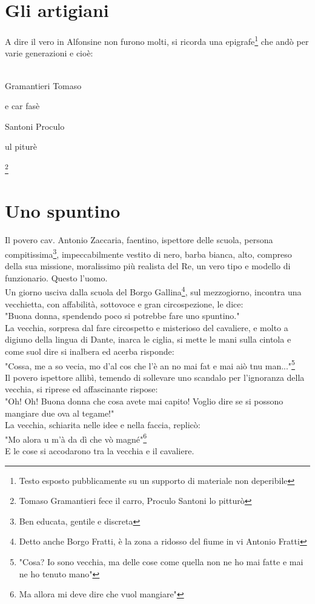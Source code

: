 \documentclass[10pt]{memoir} %
\begin{document}

\chapter{Gli artigiani}

A dire il vero in Alfonsine non furono molti, si ricorda una epigrafe\footnote{Testo esposto pubblicamente su un supporto di materiale non deperibile} che andò per varie generazioni e cioè:
\\\\
\textcal \Huge
	\centerline{Gramantieri Tomaso}
	\centerline{e car fasè}
	\centerline{Santoni Proculo}
	\centerline{ul piturè}\footnote{Tomaso Gramantieri fece il carro, Proculo Santoni lo pitturò}
\normalfont \normalsize
{}


\chapter{Uno spuntino}
Il povero cav. Antonio Zaccaria, faentino, ispettore delle scuola, persona compitissima\footnote{Ben educata, gentile e discreta}, impeccabilmente vestito di nero, barba bianca, alto, compreso della sua missione, moralissimo più realista del Re, un vero tipo e modello di funzionario. Questo l'uomo.\\
Un giorno usciva dalla scuola del Borgo Gallina\footnote{Detto anche Borgo Fratti, è la zona a ridosso del fiume in vi Antonio Fratti}, sul mezzogiorno, incontra una vecchietta, con affabilità, sottovoce e gran circospezione, le dice:\\
"Buona donna, spendendo poco si potrebbe fare uno spuntino."\\
La vecchia, sorpresa dal fare circospetto e misterioso del cavaliere, e molto a digiuno della lingua di Dante, inarca le ciglia, si mette le mani sulla cintola e come suol dire si inalbera ed acerba risponde:\\
"Cossa, me a so vecia, mo d'al cos che l'è an no mai fat e mai aiò tnu man..."\footnote{"Cosa? Io sono vecchia, ma delle cose come quella non ne ho mai fatte e mai ne ho tenuto mano"}\\
Il povero ispettore allibì, temendo di sollevare uno scandalo per l'ignoranza della vecchia, si riprese ed affascinante rispose:\\
"Oh! Oh! Buona donna che cosa avete mai capito! Voglio dire se si possono mangiare due ova al tegame!"\\
La vecchia, schiarita nelle idee e nella faccia, replicò:\\
"Mo alora u m'à da dì che vò magné"\footnote{Ma allora mi deve dire che vuol mangiare"}\\
E le cose si accodarono tra la vecchia e il cavaliere.
\end{document}
